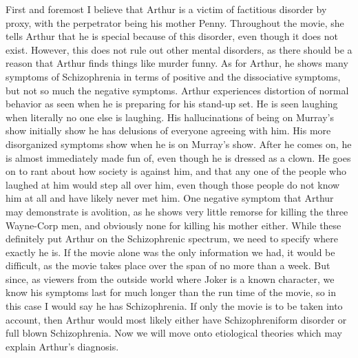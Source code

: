 \documentclass[12pt]{article}
\begin{document}
\par
First and foremost I believe that Arthur is a victim of factitious disorder by proxy, with the perpetrator being his mother Penny. Throughout the movie, she tells Arthur that he is special because of this disorder, even though it does not exist. However, this does not rule out other mental disorders, as there should be a reason that Arthur finds things like murder funny. As for Arthur, he shows many symptoms of Schizophrenia in terms of positive and the dissociative symptoms, but not so much the negative symptoms. Arthur experiences distortion of normal behavior as seen when he is preparing for his stand-up set. He is seen laughing when literally no one else is laughing. His hallucinations of being on Murray's show initially show he has delusions of everyone agreeing with him. His more disorganized symptoms show when he is on Murray's show. After he comes on, he is almost immediately made fun of, even though he is dressed as a clown. He goes on to rant about how society is against him, and that any one of the people who laughed at him would step all over him, even though those people do not know him at all and have likely never met him. One negative symptom that Arthur may demonstrate is avolition, as he shows very little remorse for killing the three Wayne-Corp men, and obviously none for killing his mother either. While these definitely put Arthur on the Schizophrenic spectrum, we need to specify where exactly he is. If the movie alone was the only information we had, it would be difficult, as the movie takes place over the span of no more than a week. But since, as viewers from the outside world where Joker is a known character, we know his symptoms last for much longer than the run time of the movie, so in this case I would say he has Schizophrenia. If only the movie is to be taken into account, then Arthur would most likely either have Schizophreniform disorder or full blown Schizophrenia. Now we will move onto etiological theories which may explain Arthur's diagnosis.
\par
\end{document}
